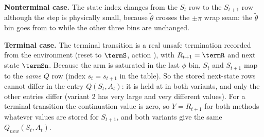 \documentclass[11pt]{article}
\begin{document}
\textbf{Nonterminal case.} The state index changes from the $S_t$ row to the $S_{t+1}$ row although the step is physically small, because $\widetilde\theta$ crosses the $\pm\pi$ wrap seam: the $\widetilde\theta$ bin goes from \seamFrom{} to \seamTo{} while the other three bins are unchanged.

\textbf{Terminal case.} The terminal transition is a real unsafe termination recorded from the environment (reset to $\termS$, action \termA), with $R_{t+1}=\termR$ and next state $\termSn$. Because the arm is saturated in the last $\phi$ bin, $S_t$ and $S_{t+1}$ map to the \emph{same} $Q$ row (index \mbox{$s_t=s_{t+1}$} in the table). So the stored next-state rows cannot differ in the entry $Q(S_t,A_t)$: it is held at \termQsa{} in both variants, and only the other entries differ (variant 2 has very large and very different values). For a terminal transition the continuation value is zero, so $Y=R_{t+1}$ for both methods whatever values are stored for $S_{t+1}$, and both variants give the same $Q_{new}(S_t,A_t)$.
\end{document}
